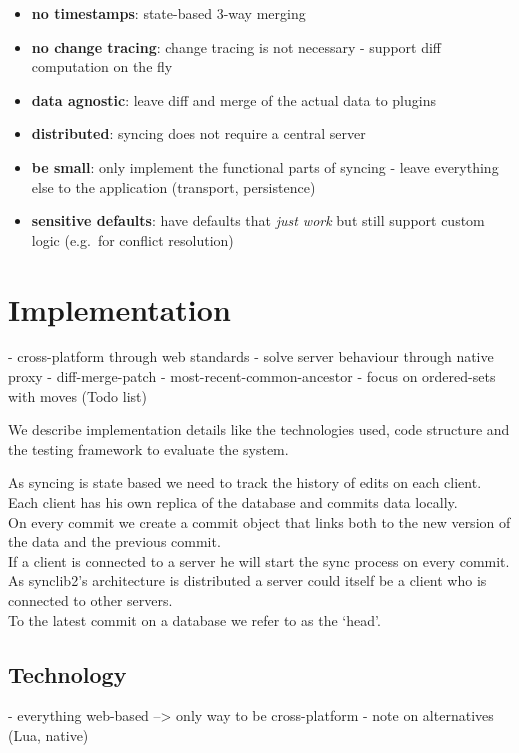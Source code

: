 \begin{itemize}
\item
  \textbf{no timestamps}: state-based 3-way merging
\item
  \textbf{no change tracing}: change tracing is not necessary - support
  diff computation on the fly
\item
  \textbf{data agnostic}: leave diff and merge of the actual data to
  plugins
\item
  \textbf{distributed}: syncing does not require a central server
\item
  \textbf{be small}: only implement the functional parts of syncing -
  leave everything else to the application (transport, persistence)
\item
  \textbf{sensitive defaults}: have defaults that \emph{just work} but
  still support custom logic (e.g.~for conflict resolution)
\end{itemize}

\section{Implementation}
- cross-platform through web standards
- solve server behaviour through native proxy
- diff-merge-patch
- most-recent-common-ancestor
- focus on ordered-sets with moves (Todo list)

We describe implementation details like the technologies used, code structure and the testing framework to evaluate the system.

As syncing is state based we need to track the history of edits on each client.\\Each client has his own replica of the database and commits
data locally.\\On every commit we create a commit object that links both
to the new version of the data and the previous commit.\\If a client is
connected to a server he will start the sync process on every commit. As
synclib2's architecture is distributed a server could itself be a client
who is connected to other servers.\\To the latest commit on a database
we refer to as the `head'.

\subsection{Technology}
- everything web-based --> only way to be cross-platform
- note on alternatives (Lua, native)

